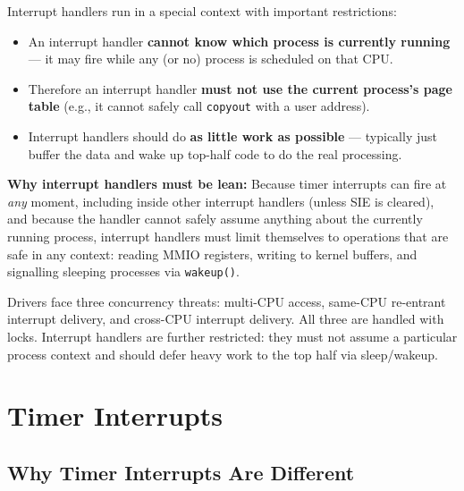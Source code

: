 \documentclass[11pt, a4paper]{article}
\begin{document}
Interrupt handlers run in a special context with important restrictions:

\begin{itemize}[leftmargin=1.5em]
  \item An interrupt handler \textbf{cannot know which process is currently running} --- it may fire while any (or no) process is scheduled on that CPU.
  \item Therefore an interrupt handler \textbf{must not use the current process's page table} (e.g., it cannot safely call \lstinline|copyout| with a user address).
  \item Interrupt handlers should do \textbf{as little work as possible} --- typically just buffer the data and wake up top-half code to do the real processing.
\end{itemize}

\begin{tcolorbox}[foundational]
\textbf{Why interrupt handlers must be lean:} Because timer interrupts can fire at \emph{any} moment, including inside other interrupt handlers (unless SIE is cleared), and because the handler cannot safely assume anything about the currently running process, interrupt handlers must limit themselves to operations that are safe in any context: reading MMIO registers, writing to kernel buffers, and signalling sleeping processes via \lstinline|wakeup()|.
\end{tcolorbox}

\begin{tcolorbox}[summary, title={Section Summary}]
Drivers face three concurrency threats: multi-CPU access, same-CPU re-entrant interrupt delivery, and cross-CPU interrupt delivery. All three are handled with locks. Interrupt handlers are further restricted: they must not assume a particular process context and should defer heavy work to the top half via sleep/wakeup.
\end{tcolorbox}

\section{Timer Interrupts}

\subsection{Why Timer Interrupts Are Different}
\end{document}
